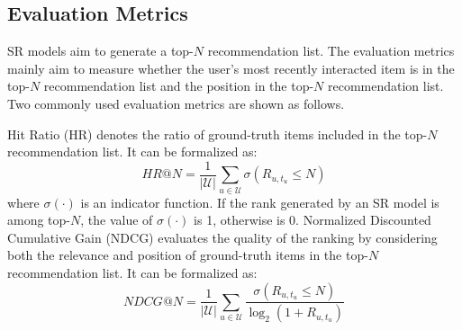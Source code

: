 \documentclass[review]{fcs}
\begin{document}
	\subsection{Evaluation Metrics}
	SR models aim to generate a top-$N$ recommendation list. The evaluation metrics mainly aim to measure whether the user's most recently interacted item is in the top-$N$ recommendation list and the position in the top-$N$ recommendation list. Two commonly used evaluation metrics \cite{SASRec,Boka.al.} are shown as follows.
	
	Hit Ratio (HR) denotes the ratio of ground-truth items included in the top-$N$ recommendation list. It can be formalized as:
	\begin{equation}
		HR@N = \frac{1}{|\mathcal{U}|}\sum_{u \in \mathcal{U}}\sigma(R_{u,t_{u}} \leq N)
	\end{equation}
	where $\sigma(\cdot)$ is an indicator function. If the rank generated by an SR model is among top-$N$, the value of $\sigma(\cdot)$ is 1, otherwise is 0.
	Normalized Discounted Cumulative Gain (NDCG) evaluates the quality of the ranking by considering both the relevance and position of ground-truth items in the top-$N$ recommendation list. It can be formalized as:
	\begin{equation}
		NDCG@N = \frac{1}{\mathcal{|U|}}\sum_{u \in \mathcal{U}}\frac{\sigma(R_{u,t_{u}} \leq N)}{\log_{2}(1 + R_{u,t_{u}})}
	\end{equation}
\end{document}
